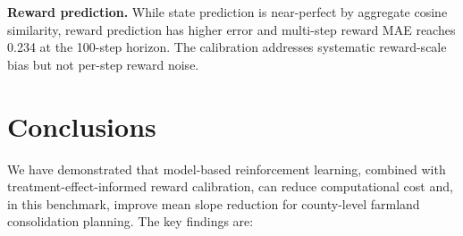 \documentclass[11pt]{article}
\begin{document}
\textbf{Reward prediction.} While state prediction is near-perfect by aggregate cosine similarity, reward prediction has higher error and multi-step reward MAE reaches 0.234 at the 100-step horizon. The calibration addresses systematic reward-scale bias but not per-step reward noise.


\section{Conclusions}
\label{sec:conclusions}

We have demonstrated that model-based reinforcement learning, combined with treatment-effect-informed reward calibration, can reduce computational cost and, in this benchmark, improve mean slope reduction for county-level farmland consolidation planning. The key findings are:
\end{document}
